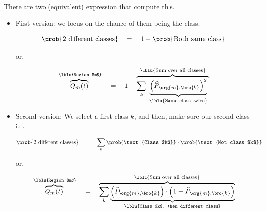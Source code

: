         There are two (equivalent) expression that compute this.

        \begin{itemize}
            \item First version: we focus on the chance of them being the  class.

                \begin{equation}
                    \prob{\text{2 different classes}} \quad=\quad 
                    1 - \prob{\text{Both same class}} 
                \end{equation}
        
                or,
        
                \begin{equation}
                    \overbrace{
                    Q_m(t) 
                    }^{\text{ \lblu{Region $m$}}}
                    \quad=\quad 1 - 
                    \overbrace{
                        \sum_{k} 
                        \underbrace{ \Big(\widehat{P}_{\org{m},\bro{k}} \Big)^2}
                        _{\text{ \lblu{Same class twice} }}
                    }^{\text{ \lblu{Sum over all classes} }}
                \end{equation}
        
            \item Second version: We select a first class $k$, and then, make sure our second class is .


                \begin{equation}
                    \prob{\text{2 different classes}} \quad=\quad 
                    \sum_k \prob{\text{Class $k$}} \cdot  \prob{\text{Not class $k$}}
                \end{equation}


                or,

                \begin{equation}
                    \overbrace{
                    Q_m(t) 
                    }^{\text{ \lblu{Region $m$}}}
                    \quad=\quad 
                    \overbrace{
                        \sum_{k} 
                        \underbrace{ \Big(\widehat{P}_{\org{m},\bro{k}} \Big) \cdot \Big( 1-\widehat{P}_{\org{m},\bro{k}} \Big)}
                        _{\text{ \lblu{Class $k$, then different class} }}
                    }^{\text{ \lblu{Sum over all classes} }}
                \end{equation}
        \end{itemize}

